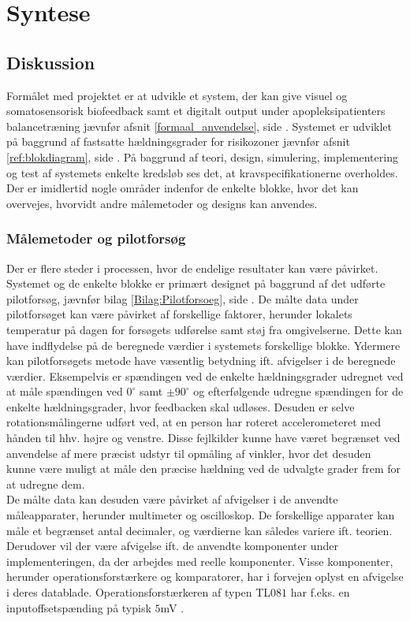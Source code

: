 \chapter{Syntese}
\section{Diskussion}
Formålet med projektet er at udvikle et system, der kan give visuel og somatosensorisk biofeedback samt et digitalt output under apopleksipatienters balancetræning jævnfør afsnit \ref{formaal_anvendelse}, side \pageref{formaal_anvendelse}. Systemet er udviklet på baggrund af fastsatte hældningsgrader for risikozoner jævnfør afsnit \ref{ref:blokdiagram}, side \pageref{ref:blokdiagram}. På baggrund af teori, design, simulering, implementering og test af systemets enkelte kredsløb ses det, at kravspecifikationerne overholdes. Der er imidlertid nogle områder indenfor de enkelte blokke, hvor det kan overvejes, hvorvidt andre målemetoder og designs kan anvendes.

\subsection{Målemetoder og pilotforsøg}
Der er flere steder i processen, hvor de endelige resultater kan være  påvirket. Systemet og de enkelte blokke er primært designet på baggrund af det udførte pilotforsøg, jævnfør bilag \ref{Bilag:Pilotforsoeg}, side \pageref{Bilag:Pilotforsoeg}. De målte data under pilotforsøget kan være påvirket af forskellige faktorer, herunder lokalets temperatur på dagen for forsøgets udførelse samt støj fra omgivelserne. Dette kan have indflydelse på de beregnede værdier i systemets forskellige blokke.
Ydermere kan pilotforsøgets metode have væsentlig betydning ift. afvigelser i de beregnede værdier. Eksempelvis er spændingen ved de enkelte hældningsgrader udregnet ved at måle spændingen ved $0^{\circ}$ samt $\pm90^{\circ}$ og efterfølgende udregne spændingen for de enkelte hældningsgrader, hvor feedbacken skal udløses. Desuden er selve rotationsmålingerne udført ved, at en person har roteret accelerometeret med hånden til hhv. højre og venstre. Disse fejlkilder kunne have været begrænset ved anvendelse af mere præcist udstyr til opmåling af vinkler, hvor det desuden kunne være muligt at måle den præcise hældning ved de udvalgte grader frem for at udregne dem.  \\
De målte data kan desuden være påvirket af afvigelser i de anvendte måleapparater, herunder multimeter og oscilloskop. De forskellige apparater kan måle et begrænset antal decimaler, og værdierne kan således variere ift. teorien. Derudover vil der være afvigelse ift. de anvendte komponenter under implementeringen, da der arbejdes med reelle komponenter. Visse komponenter, herunder operationsforstærkere og komparatorer, har i forvejen oplyst en afvigelse i deres datablade. Operationsforstærkeren af typen TL$081$ har f.eks. en inputoffsetspænding på typisk $5$mV \cite{Corporation1995}.

